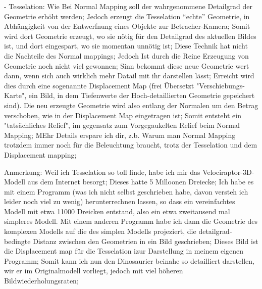 - Tesselation: Wie Bei Normal Mapping soll der wahrgenommene Detailgrad der Geometrie erhöht werden; Jedoch erzeugt die Tesselation "`echte"' Geometrie, in Abhängigkeit von der Entwerfnung eines Objekte zur Betracher-Kamera; Somit wird dort Geometrie erzeugt, wo sie nötig für den Detailgrad des aktuellen Bildes ist, und dort eingespart, wo sie momentan unnötig ist; Diese Technik hat nicht die Nachteile des Normal mappings; Jedoch Ist durch die Reine Erzeugung von Geometrie noch nicht viel gewonnen; Sinn bekommt diese neue  Geometrie wert dann, wenn sich auch wirklich mehr Datail mit ihr darstellen lässt; Erreicht wird dies durch eine sogenannte Displacement Map (frei Übersetzt "Verschiebungs-Karte", ein Bild, in dem Tiefenwerte der Hoch-detaillierten Geometrie gepeichert sind). Die neu erzeugte Geometrie wird also entlang der Normalen um den Betrag verschoben, wie in der Displacement Map eingetragen ist; Somit entsteht ein "tatsächliches Relief", im gegensatz zum Vorgegaukelten Relief beim Normal Mapping; MEhr Details erspare ich dir, z.b. Warum man Normal Mapping trotzdem immer noch für die Beleuchtung braucht, trotz der Tesselation und dem Displacement mapping;

Anmerkung: Weil ich Tesselation so toll finde, habe ich mir das Velociraptor-3D-Modell aus dem Internet besorgt; Dieses hatte 5 Milloonen Dreiecke; Ich habe es mit einem Programm (was ich nicht selbst geschrieben habe, davon versteh ich leider noch viel zu wenig) herunterrechnen lassen, so  dass ein vereinfachtes Modell mit etwa 11000 Dreicken entstand, also ein etwa zweitausend mal simpleres Modell. Mit einem anderen Programm habe ich dann die Geometrie des komplexen Modells auf die des simplen Modells projeziert, die detailgrad-bedingte Distanz zwischen den Geometrien in ein Bild geschrieben; Dieses Bild ist die Displacement map für die Tesselation izur Darstellung in meinem eigenen Programm; Somit kann ich nun den Dinosaurier beinahe so detailliert darstellen, wir er im Originalmodell vorliegt, jedoch mit viel höheren Bildwiederholungsraten; 

	  

\clearpage
